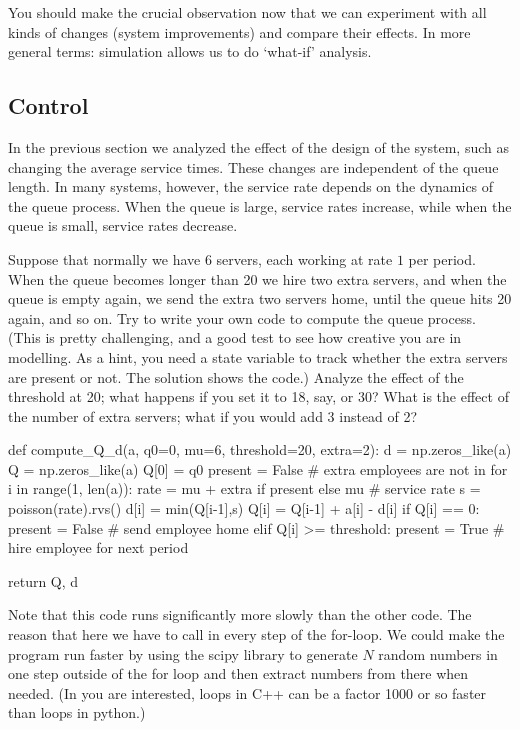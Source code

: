 \documentclass{scrartcl}
\begin{document}
You should make the crucial observation now that we can experiment with all kinds of changes (system improvements) and compare their effects. In more general terms: simulation allows us to do `what-if' analysis. 




\subsection{Control }
\label{sec:control-}

In the previous section we analyzed the effect of the design of the system, such as changing the average service times. These changes are independent of the queue length. In many systems, however, the service rate depends on the dynamics of the queue process. When the queue is large, service rates increase, while when the queue is small, service rates decrease. 

\begin{exercise}
  Suppose that normally we have 6 servers, each working at rate $1$ per period. When the queue becomes longer than 20 we hire two extra servers, and when the queue is empty again, we send the extra two servers home, until the queue hits 20 again, and so on. Try to write your own code to compute the queue process. (This is pretty challenging, and a good test to see how creative you are in modelling. As a hint, you need a state variable to track whether the extra servers are present or not. The solution shows the code.) Analyze the effect of the threshold at 20; what happens if you set it to 18, say, or 30? What is the effect of the number of extra servers; what if you would add 3 instead of 2?
  

  \begin{solution}
    \begin{pyverbatim}
def compute_Q_d(a, q0=0, mu=6, threshold=20, extra=2):
    d = np.zeros_like(a)
    Q = np.zeros_like(a)
    Q[0] = q0
    present = False # extra employees are not in
    for i in range(1, len(a)):
        rate = mu + extra if present else mu # service rate
        s = poisson(rate).rvs()
        d[i] = min(Q[i-1],s)
        Q[i] = Q[i-1] + a[i] - d[i]
        if Q[i] == 0:
            present = False # send employee home
        elif Q[i] >= threshold:
            present = True # hire employee for next period
    
    return Q, d
    
    \end{pyverbatim}



Note that this code runs significantly more slowly than the other code. The reason that here we have to call  in every step of the for-loop. We could make the program run faster by using the scipy library to generate $N$ random numbers in one step outside of the for loop and then extract numbers from there when needed. (In you are interested, loops in C++ can be a factor 1000 or so faster than loops in python.)
  \end{solution}
  
\end{exercise}
\end{document}
